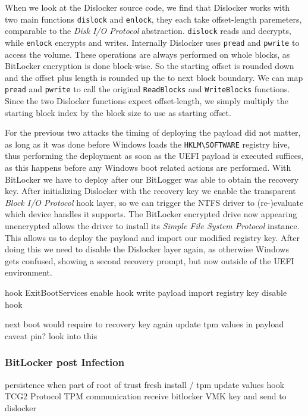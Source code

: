 When we look at the Dislocker source code, we find that Dislocker works with two main functions \lstinline{dislock} and \lstinline{enlock}, they each take offset-length paremeters, comparable to the \emph{Disk I/O Protocol} abstraction. \lstinline{dislock} reads and decrypts, while \lstinline{enlock} encrypts and writes. Internally Dislocker uses \lstinline{pread} and \lstinline{pwrite} to access the volume. These operations are always performed on whole blocks, as BitLocker encryption is done block-wise. So the starting offset is rounded down and the offset plus length is rounded up the to next block boundary. We can map \lstinline{pread} and \lstinline{pwrite} to call the original \lstinline{ReadBlocks} and \lstinline{WriteBlocks} functions. Since the two Dislocker functions expect offset-length, we simply multiply the starting block index by the block size to use as starting offset.


For the previous two attacks the timing of deploying the payload did not matter, as long as it was done before Windows loads the \lstinline{HKLM\SOFTWARE} registry hive, thus performing the deployment as soon as the \ac{UEFI} payload is executed suffices, as this happens before any Windows boot related actions are performed.
With BitLocker we have to deploy after our BitLogger was able to obtain the recovery key.
After initializing Dislocker with the recovery key we enable the transparent \emph{Block I/O Protocol} hook layer, so we can trigger the \ac{NTFS} driver to (re-)evaluate which device handles it supports.
The BitLocker encrypted drive now appearing unencrypted allows the driver to install its \emph{Simple File System Protocol} instance. This allows us to deploy the payload and import our modified registry key. After doing this we need to disable the Dislocker layer again, as otherwise Windows gets confused, showing a second recovery prompt, but now outside of the \ac{UEFI} environment.

\cite{exitbootservices-hooking}
hook ExitBootServices
enable hook
write payload
import registry key
disable hook

next boot would require to recovery key again
update tpm values in payload
\cite{microsoft-bitlocker-manage-bde}
caveat pin? look into this


\subsubsection{BitLocker post Infection}
persistence when part of root of trust
fresh install / tpm update values
hook \ac{TCG2} Protocol \cite[6.7.3]{tcg-efi-protocol-spec}
\ac{TPM} communication
receive bitlocker \ac{VMK} key and send to dislocker
\cite{bde-format-spec}
\cite{tpm-sniffing}

